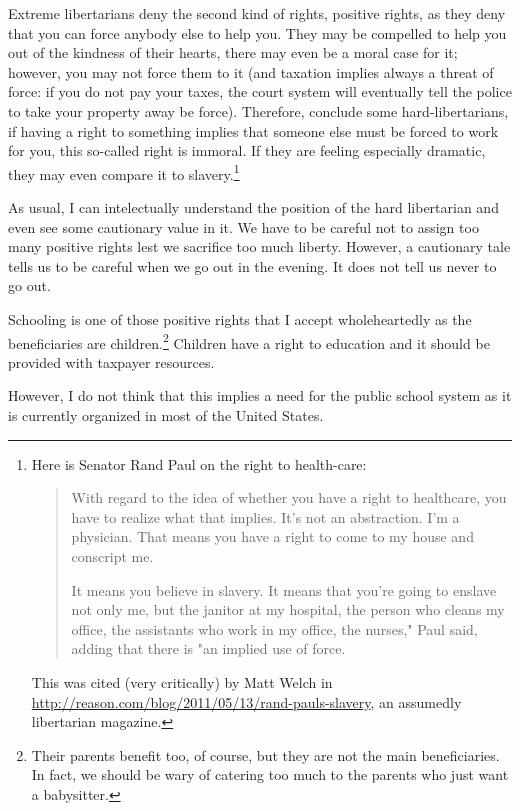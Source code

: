Extreme libertarians deny the second kind of rights, positive rights, as they
deny that you can force anybody else to help you. They may be compelled to help
you out of the kindness of their hearts, there may even be a moral case for it;
however, you may not force them to it (and taxation implies always a threat of
force: if you do not pay your taxes, the court system will eventually tell the
police to take your property away be force). Therefore, conclude some
hard-libertarians, if having a right to something implies that someone else
must be forced to work for you, this so-called right is immoral. If they are
feeling especially dramatic, they may even compare it to slavery.\footnote{Here
is Senator Rand Paul on the right to health-care:

\begin{quote}
With regard to the idea of whether you have a right to healthcare, you have to
realize what that implies. It's not an abstraction. I'm a physician. That means
you have a right to come to my house and conscript me.

It means you believe in slavery. It means that you're going to enslave not only
me, but the janitor at my hospital, the person who cleans my office, the
assistants who work in my office, the nurses," Paul said, adding that there is
"an implied use of force.
\end{quote}

This was cited (very critically) by Matt Welch in
\href{Reason}{http://reason.com/blog/2011/05/13/rand-pauls-slavery}, an
assumedly libertarian magazine.}

As usual, I can intelectually understand the position of the hard libertarian
and even see some cautionary value in it. We have to be careful not to assign
too many positive rights lest we sacrifice too much liberty. However, a
cautionary tale tells us to be careful when we go out in the evening. It does
not tell us never to go out.

Schooling is one of those positive rights that I accept wholeheartedly as the
beneficiaries are children.\footnote{Their parents benefit too, of course, but
they are not the main beneficiaries. In fact, we should be wary of catering too
much to the parents who just want a babysitter.} Children have a right to
education and it should be provided with taxpayer resources.

However, I do not think that this implies a need for the public school system
as it is currently organized in most of the United States.

